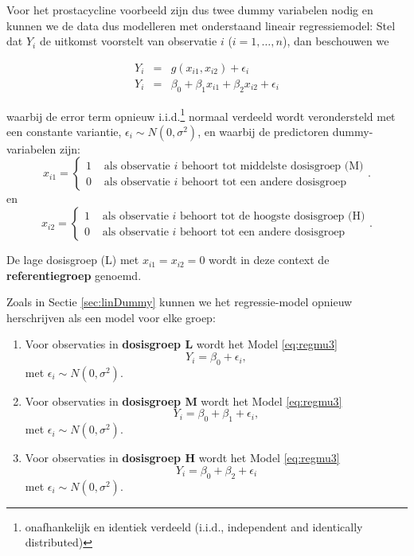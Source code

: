 \documentclass[12pt,dutch,coursenotes]{book}
\let\rmarkdownfootnote\footnote%
\def\footnote{\protect\rmarkdownfootnote}
\theoremstyle{definition}
\theoremstyle{definition}
\theoremstyle{definition}
\theoremstyle{remark}
\begin{document}
Voor het prostacycline voorbeeld zijn dus twee dummy variabelen nodig en
kunnen we de data dus modelleren met onderstaand lineair regressiemodel:
Stel dat \(Y_i\) de uitkomst voorstelt van observatie \(i\)
(\(i=1,\ldots, n\)), dan beschouwen we

\begin{eqnarray}
  Y_i &=& g(x_{i1},x_{i2}) + \epsilon_i\\
  Y_i &=& \beta_0+\beta_1 x_{i1} +\beta_2 x_{i2} +\epsilon_i \label{eq:regmu3}
\end{eqnarray}

waarbij de error term opnieuw i.i.d.\footnote{onafhankelijk en identiek
  verdeeld (i.i.d., independent and identically distributed)} normaal
verdeeld wordt verondersteld met een constante variantie,
\(\epsilon_i\sim N(0,\sigma^2)\), en waarbij de predictoren
dummy-variabelen zijn: \[x_{i1} = \left\{ \begin{array}{ll} 
1 & \text{ als observatie $i$ behoort tot middelste dosisgroep (M)} \\
0 & \text{ als observatie $i$ behoort tot  een andere dosisgroep} \end{array}\right. .\]
en \[x_{i2} = \left\{ \begin{array}{ll} 
1 & \text{ als observatie $i$ behoort tot de hoogste dosisgroep (H)} \\
0 & \text{ als observatie $i$ behoort tot een andere dosisgroep} \end{array}\right. .\]

De lage dosisgroep (L) met \(x_{i1}=x_{i2}=0\) wordt in deze context de
\textbf{referentiegroep} genoemd.

Zoals in Sectie \ref{sec:linDummy} kunnen we het regressie-model opnieuw
herschrijven als een model voor elke groep:

\begin{enumerate}
\def\labelenumi{\arabic{enumi}.}
\item
  Voor observaties in \textbf{dosisgroep L} wordt het Model
  \eqref{eq:regmu3} \[Y_i = \beta_0+\epsilon_i,\] met
  \(\epsilon_i \sim N(0,\sigma^2)\).
\item
  Voor observaties in \textbf{dosisgroep M} wordt het Model
  \eqref{eq:regmu3} \[Y_i = \beta_0+\beta_1 + \epsilon_i,\] met
  \(\epsilon_i \sim N(0,\sigma^2)\).
\item
  Voor observaties in \textbf{dosisgroep H} wordt het Model
  \eqref{eq:regmu3} \[Y_i = \beta_0+\beta_2 + \epsilon_i\] met
  \(\epsilon_i \sim N(0,\sigma^2)\).
\end{enumerate}
\end{document}
